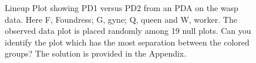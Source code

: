 \documentclass[12]{article}
\begin{document}
\begin{figure}[hbtp]
   \centering
       \caption{Lineup Plot showing PD1 versus PD2 from an PDA on the wasp data. Here F, Foundress; G, gyne; Q, queen and W, worker. The observed data plot is placed randomly among 19 null plots. Can you identify the plot which has the most separation between the colored groups? The solution is provided in the Appendix.  }
       \label{toth_pda}
\end{figure}   
\end{document}

